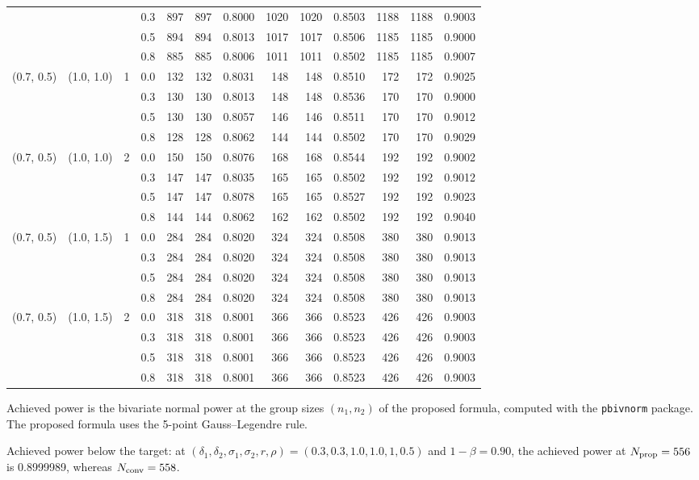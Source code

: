 \begin{table}[ht]
\begin{threeparttable}
\begin{tabular}{ccccrrrrrrrrr}
 &  &  & 0.3 & 897 & 897 & 0.8000 & 1020 & 1020 & 0.8503 & 1188 & 1188 & 0.9003 \\
 &  &  & 0.5 & 894 & 894 & 0.8013 & 1017 & 1017 & 0.8506 & 1185 & 1185 & 0.9000 \\
 &  &  & 0.8 & 885 & 885 & 0.8006 & 1011 & 1011 & 0.8502 & 1185 & 1185 & 0.9007 \\
(0.7, 0.5) & (1.0, 1.0) & 1 & 0.0 & 132 & 132 & 0.8031 & 148 & 148 & 0.8510 & 172 & 172 & 0.9025 \\
 &  &  & 0.3 & 130 & 130 & 0.8013 & 148 & 148 & 0.8536 & 170 & 170 & 0.9000 \\
 &  &  & 0.5 & 130 & 130 & 0.8057 & 146 & 146 & 0.8511 & 170 & 170 & 0.9012 \\
 &  &  & 0.8 & 128 & 128 & 0.8062 & 144 & 144 & 0.8502 & 170 & 170 & 0.9029 \\
(0.7, 0.5) & (1.0, 1.0) & 2 & 0.0 & 150 & 150 & 0.8076 & 168 & 168 & 0.8544 & 192 & 192 & 0.9002 \\
 &  &  & 0.3 & 147 & 147 & 0.8035 & 165 & 165 & 0.8502 & 192 & 192 & 0.9012 \\
 &  &  & 0.5 & 147 & 147 & 0.8078 & 165 & 165 & 0.8527 & 192 & 192 & 0.9023 \\
 &  &  & 0.8 & 144 & 144 & 0.8062 & 162 & 162 & 0.8502 & 192 & 192 & 0.9040 \\
(0.7, 0.5) & (1.0, 1.5) & 1 & 0.0 & 284 & 284 & 0.8020 & 324 & 324 & 0.8508 & 380 & 380 & 0.9013 \\
 &  &  & 0.3 & 284 & 284 & 0.8020 & 324 & 324 & 0.8508 & 380 & 380 & 0.9013 \\
 &  &  & 0.5 & 284 & 284 & 0.8020 & 324 & 324 & 0.8508 & 380 & 380 & 0.9013 \\
 &  &  & 0.8 & 284 & 284 & 0.8020 & 324 & 324 & 0.8508 & 380 & 380 & 0.9013 \\
(0.7, 0.5) & (1.0, 1.5) & 2 & 0.0 & 318 & 318 & 0.8001 & 366 & 366 & 0.8523 & 426 & 426 & 0.9003 \\
 &  &  & 0.3 & 318 & 318 & 0.8001 & 366 & 366 & 0.8523 & 426 & 426 & 0.9003 \\
 &  &  & 0.5 & 318 & 318 & 0.8001 & 366 & 366 & 0.8523 & 426 & 426 & 0.9003 \\
 &  &  & 0.8 & 318 & 318 & 0.8001 & 366 & 366 & 0.8523 & 426 & 426 & 0.9003 \\
\hline
\end{tabular}
\begin{tablenotes}
\footnotesize
\item[] Achieved power is the bivariate normal power at the group sizes $(n_1, n_2)$ of the proposed formula, computed with the \texttt{pbivnorm} package. The proposed formula uses the 5-point Gauss--Legendre rule.
\item[$\dagger$] Achieved power below the target: at $(\delta_1, \delta_2, \sigma_1, \sigma_2, r, \rho) = (0.3, 0.3, 1.0, 1.0, 1, 0.5)$ and $1 - \beta = 0.90$, the achieved power at $N_{\rm prop} = 556$ is 0.8999989, whereas $N_{\rm conv} = 558$.
\end{tablenotes}
\end{threeparttable}
\end{table}

